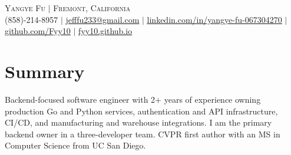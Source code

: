\documentclass[letterpaper,11pt]{article}
\begin{document}

\begin{center}
    {\Huge \scshape Yangye Fu \upshape\small $|$ Fremont, California} \\ \vspace{1pt}
    \small (858)-214-8957 $|$
    \href{mailto:jefffu233@gmail.com}{\underline{jefffu233@gmail.com}} $|$
    \href{https://www.linkedin.com/in/yangye-fu-067304270/}{\underline{linkedin.com/in/yangye-fu-067304270}} $|$
    \href{https://github.com/Fyy10}{\underline{github.com/Fyy10}} $|$
    \href{https://fyy10.github.io}{\underline{fyy10.github.io}}
    \vspace{-8pt}
\end{center}

\section{Summary}
Backend-focused software engineer with 2+ years of experience owning production Go and Python services, authentication and API infrastructure, CI/CD, and manufacturing and warehouse integrations. I am the primary backend owner in a three-developer team. CVPR first author with an MS in Computer Science from UC San Diego.
\vspace{-8pt}


\end{document}
